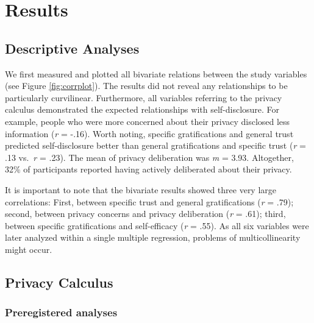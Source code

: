 \documentclass[
  english,
  man,floatsintext]{apa6}
\begin{document}
\hypertarget{results}{%
\section{Results}\label{results}}

\hypertarget{descriptive-analyses}{%
\subsection{Descriptive Analyses}\label{descriptive-analyses}}

We first measured and plotted all bivariate relations between the study variables (see Figure \ref{fig:corrplot}).
The results did not reveal any relationships to be particularly curvilinear.
Furthermore, all variables referring to the privacy calculus demonstrated the expected relationships with self-disclosure.
For example, people who were more concerned about their privacy disclosed less information (\emph{r} = -.16).
Worth noting, specific gratifications and general trust predicted self-disclosure better than general gratifications and specific trust (\emph{r} = .13 vs.~\emph{r} = .23).
The mean of privacy deliberation was \emph{m} = 3.93. Altogether, 32\% of participants reported having actively deliberated about their privacy.

It is important to note that the bivariate results showed three very large correlations: First, between specific trust and general gratifications (\emph{r} = .79); second, between privacy concerns and privacy deliberation (\emph{r} = .61); third, between specific gratifications and self-efficacy (\emph{r} = .55). As all six variables were later analyzed within a single multiple regression, problems of multicollinearity might occur.

\hypertarget{privacy-calculus}{%
\subsection{Privacy Calculus}\label{privacy-calculus}}

\hypertarget{preregistered-analyses}{%
\subsubsection{Preregistered analyses}\label{preregistered-analyses}}
\end{document}
